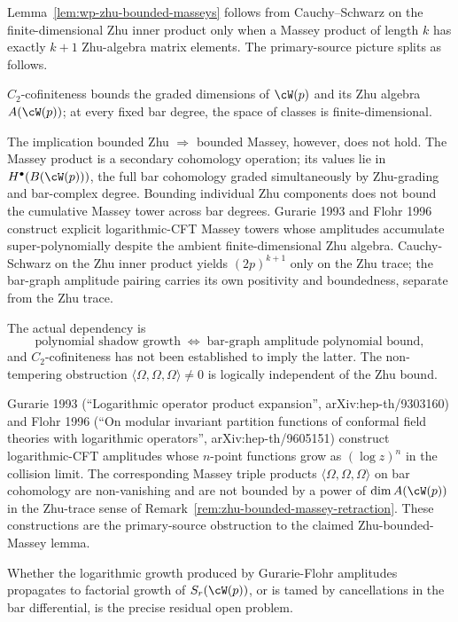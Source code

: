 \begin{remark}
\label{rem:zhu-bounded-massey-retraction}
Lemma~\ref{lem:wp-zhu-bounded-masseys} follows from Cauchy--Schwarz on
the finite-dimensional Zhu inner product only when a Massey product of
length $k$ has exactly $k+1$ Zhu-algebra matrix elements. The
primary-source picture splits as follows.

$C_2$-cofiniteness bounds the graded dimensions of $\cW(p)$ and its
Zhu algebra $A(\cW(p))$; at every fixed bar degree, the space of
classes is finite-dimensional.

The implication bounded Zhu $\Rightarrow$ bounded Massey, however,
does not hold. The Massey product is a secondary cohomology operation;
its values lie in $H^{\bullet}(B(\cW(p)))$, the full bar cohomology
graded simultaneously by Zhu-grading and bar-complex degree. Bounding
individual Zhu components does not bound the cumulative Massey tower
across bar degrees. Gurarie 1993 and Flohr 1996 construct explicit
logarithmic-CFT Massey towers whose amplitudes accumulate
super-polynomially despite the ambient finite-dimensional Zhu algebra.
Cauchy-Schwarz on the Zhu inner product yields $(2p)^{k+1}$ only on
the Zhu trace; the bar-graph amplitude pairing carries its own
positivity and boundedness, separate from the Zhu trace.

The actual dependency is
\[
 \text{polynomial shadow growth} \;\Longleftrightarrow\;
 \text{bar-graph amplitude polynomial bound},
\]
and $C_2$-cofiniteness has not been established to imply the latter.
The non-tempering obstruction
$\langle \Omega, \Omega, \Omega \rangle \ne 0$ is logically
independent of the Zhu bound.
\end{remark}

\begin{remark}
\label{rem:gurarie-flohr-massey-obstruction}
Gurarie 1993 (``Logarithmic operator product expansion'',
arXiv:hep-th/9303160) and Flohr 1996 (``On modular invariant
partition functions of conformal field theories with logarithmic
operators'', arXiv:hep-th/9605151) construct logarithmic-CFT
amplitudes whose $n$-point functions grow as $(\log z)^{n}$ in the
collision limit. The corresponding Massey triple products
$\langle \Omega, \Omega, \Omega \rangle$ on bar cohomology are
non-vanishing and are not bounded by a power of $\dim A(\cW(p))$ in
the Zhu-trace sense of
Remark~\ref{rem:zhu-bounded-massey-retraction}. These constructions
are the primary-source obstruction to the claimed
Zhu-bounded-Massey lemma.

Whether the logarithmic growth produced by Gurarie-Flohr amplitudes
propagates to factorial growth of $S_r(\cW(p))$, or is tamed by
cancellations in the bar differential, is the precise residual open
problem.
\end{remark}

